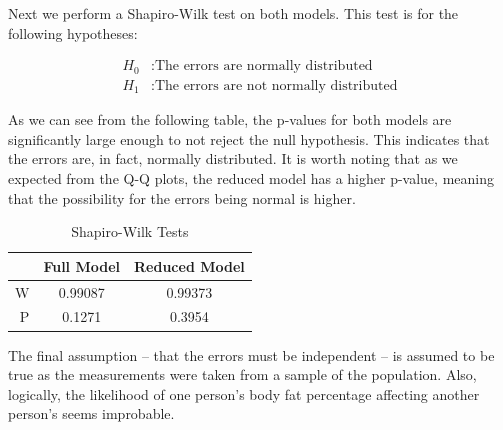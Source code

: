 \documentclass[a4paper, 11pt]{article}
\begin{document}
Next we perform a Shapiro-Wilk test on both models. This test is for the following hypotheses:
\vspace{-1cm}
\begin{center}
	\begin{align*}
		H_0&: \text{The errors are normally distributed}\\
		H_1&: \text{The errors are not normally distributed}
	\end{align*}
\end{center}

As we can see from the following table, the p-values for both models are significantly large enough to not reject the null hypothesis. This indicates that the errors are, in fact, normally distributed. It is worth noting that as we expected from the Q-Q plots, the reduced model has a higher p-value, meaning that the possibility for the errors being normal is higher.
\begin{table}[H]
	\centering
	\begin{tabular}{ r | c | c }
		& Full Model & Reduced Model \\ \hline
		W & 0.99087 & 0.99373 \\
		P & 0.1271 & 0.3954
	\end{tabular}
	\caption{Shapiro-Wilk Tests}
	\label{table:SW}
\end{table}

The final assumption -- that the errors must be independent -- is assumed to be true as the measurements were taken from a sample of the population. Also, logically, the likelihood of one person's body fat percentage affecting another person's seems improbable.


%
\end{document}
